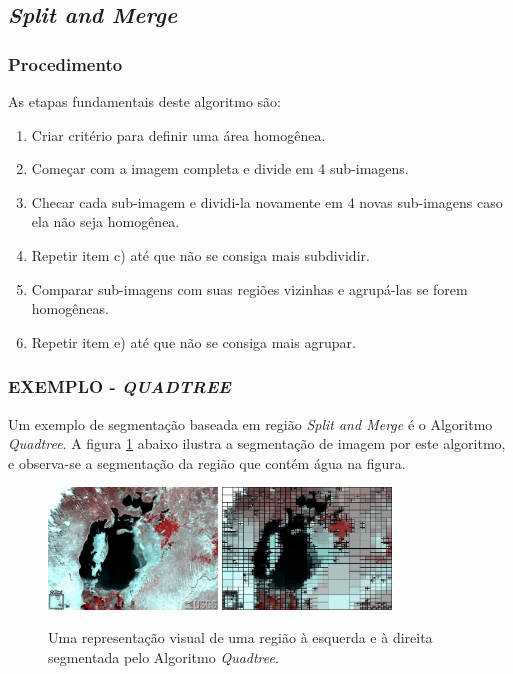 \subsection{\textit{Split and Merge}}
\subsubsection{Procedimento}
As etapas fundamentais deste algoritmo são: 
\begin{enumerate}
    \item Criar critério para definir uma área homogênea.
    \item Começar com a imagem completa e divide em 4 sub-imagens.
    \item Checar cada sub-imagem e dividi-la novamente em 4 novas sub-imagens caso ela não seja homogênea.
    \item Repetir item c) até que não se consiga mais subdividir.
    \item Comparar sub-imagens com suas regiões vizinhas e agrupá-las se forem homogêneas.
    \item Repetir item e) até que não se consiga mais agrupar.
\end{enumerate}

\subsubsection{EXEMPLO - \textit{QUADTREE}}
Um exemplo de segmentação baseada em região \textit{Split and Merge} é o Algoritmo \textit{Quadtree}. A figura \ref{fig:aral} abaixo ilustra a segmentação de imagem por este algoritmo, e observa-se a segmentação da região que contém água na figura.

\begin{figure}[!htb]
 \centering
 \def\baselinestretch{1}\small\normalsize
 \includegraphics[width=0.4\textwidth]{img/stf-aral1997.jpg}\qquad
 \includegraphics[width=0.4\textwidth]{img/stf-aral1997-quadtree.jpg} 
 \caption{\label{fig:aral}Uma representação visual de uma região \citep{stanford} à esquerda e à direita segmentada pelo Algoritmo \textit{Quadtree}.}
\end{figure}

